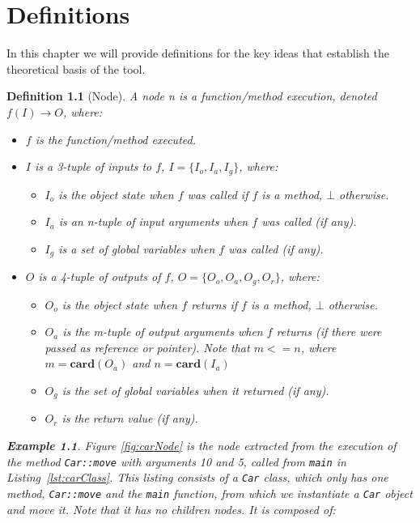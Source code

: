 \chapter{Definitions}
\label{cap:definitions}
\newtheorem{definition}{Definition}
\newtheorem{exmp}{Example}

In this chapter we will provide definitions for the key ideas that establish the theoretical basis of the tool.

\begin{definition}[Node]
A node n is a function/method execution, denoted \(f(I) \to O\), where:
\begin{itemize}
\item \(f\) is the function/method executed.
\item \(I\) is a 3-tuple of inputs to \(f\), \(I = \{I_o, I_a, I_g\}\), where:
\begin{itemize}
\item \(I_o\) is the object state when \(f\) was called if \(f\) is a method, $\bot$ otherwise.
\item \(I_a\) is an n-tuple of input arguments when \(f\) was called (if any).
\item \(I_g\) is a set of global variables when \(f\) was called (if any).
\end{itemize}
\item \(O\) is a 4-tuple of outputs of \(f\), \(O = \{O_o, O_a, O_g, O_r\}\), where:
\begin{itemize}
\item \(O_o\) is the object state when \(f\) returns if \(f\) is a method, $\bot$ otherwise.
\item \(O_a\) is the m-tuple of output arguments when \(f\) returns (if there were passed as reference or pointer). Note that \(m <= n\), where $m=\mathbf{card}(O_a)$ and $n=\mathbf{card}(I_a)$
\item \(O_g\) is the set of global variables when it returned (if any).
\item \(O_r\) is the return value (if any).
\end{itemize}
\end{itemize}

\begin{exmp}
Figure \ref{fig:carNode} is the node extracted from the execution of the method \verb|Car::move| with arguments 10 and 5, called from \verb|main| in Listing~\ref{lst:carClass}. This listing consists of a \verb|Car| class, which only has one method, \verb|Car::move| and the \verb|main| function, from which we instantiate a \verb|Car| object and move it. Note that it has no children nodes. It is composed of:


\end{exmp}
\end{definition}
